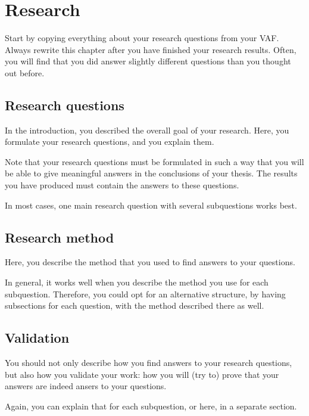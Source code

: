 \chapter{Research}
Start by copying everything about your research questions from your VAF. Always rewrite this chapter after you have finished your research results. Often, you will find that you did answer slightly different questions than you thought out before.

\section{Research questions}
In the introduction, you described the overall goal of your research.
Here, you formulate your research questions, and you explain them.

Note that your research questions must be formulated in such a way that you will be able to give meaningful answers in the conclusions of your thesis. The results you have produced must contain the answers to these questions.

In most cases, one main research question with several subquestions works best.

\section{Research method}
Here, you describe the method that you used to find answers to your questions.

In general, it works well when you describe the method you use for each subquestion.  Therefore, you could opt for an alternative structure, by having subsections for each question, with the method described there as well.

\section{Validation}
You should not only describe how you find answers to your research questions, but also how you validate your work: how you will (try to) prove that your answers are indeed ansers to your questions.

Again, you can explain that for each subquestion, or here, in a separate section.
